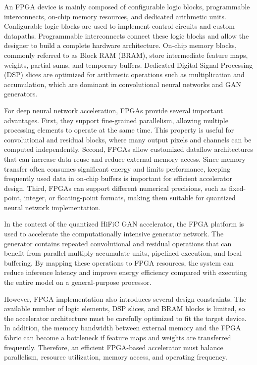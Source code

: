 An FPGA device is mainly composed of configurable logic blocks, programmable interconnects, on-chip memory resources, and dedicated arithmetic units. Configurable logic blocks are used to implement control circuits and custom datapaths. Programmable interconnects connect these logic blocks and allow the designer to build a complete hardware architecture. On-chip memory blocks, commonly referred to as Block RAM (BRAM), store intermediate feature maps, weights, partial sums, and temporary buffers. Dedicated Digital Signal Processing (DSP) slices are optimized for arithmetic operations such as multiplication and accumulation, which are dominant in convolutional neural networks and GAN generators.

For deep neural network acceleration, FPGAs provide several important advantages. First, they support fine-grained parallelism, allowing multiple processing elements to operate at the same time. This property is useful for convolutional and residual blocks, where many output pixels and channels can be computed independently. Second, FPGAs allow customized dataflow architectures that can increase data reuse and reduce external memory access. Since memory transfer often consumes significant energy and limits performance, keeping frequently used data in on-chip buffers is important for efficient accelerator design. Third, FPGAs can support different numerical precisions, such as fixed-point, integer, or floating-point formats, making them suitable for quantized neural network implementation.

In the context of the quantized HiFiC GAN accelerator, the FPGA platform is used to accelerate the computationally intensive generator network. The generator contains repeated convolutional and residual operations that can benefit from parallel multiply-accumulate units, pipelined execution, and local buffering. By mapping these operations to FPGA resources, the system can reduce inference latency and improve energy efficiency compared with executing the entire model on a general-purpose processor.

However, FPGA implementation also introduces several design constraints. The available number of logic elements, DSP slices, and BRAM blocks is limited, so the accelerator architecture must be carefully optimized to fit the target device. In addition, the memory bandwidth between external memory and the FPGA fabric can become a bottleneck if feature maps and weights are transferred frequently. Therefore, an efficient FPGA-based accelerator must balance parallelism, resource utilization, memory access, and operating frequency.

